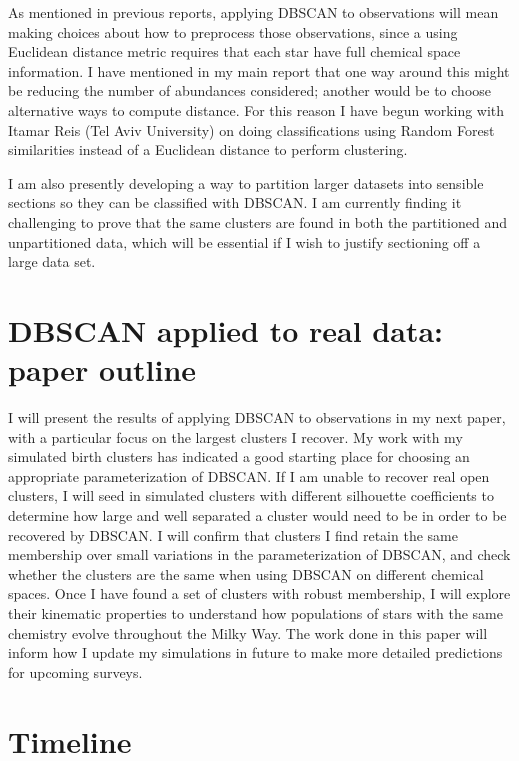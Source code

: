 \documentclass[11pt]{article}
\begin{document}
    As mentioned in previous reports, applying DBSCAN to observations will mean making choices about how to preprocess those observations, since a using Euclidean distance metric requires that each star have full chemical space information. I have mentioned in my main report that one way around this might be reducing the number of abundances considered; another would be to choose alternative ways to compute distance. For this reason I have begun working with Itamar Reis (Tel Aviv University) on doing classifications using Random Forest similarities \citep{Reis2018} instead of a Euclidean distance to perform clustering.
    
    I am also presently developing a way to partition larger datasets into sensible sections so they can be classified with DBSCAN. I am currently finding it challenging to prove that the same clusters are found in both the partitioned and unpartitioned data, which will be essential if I wish to justify sectioning off a large data set.
 
\section*{DBSCAN applied to real data: paper outline}

I will present the results of applying DBSCAN to observations in my next paper, with a particular focus on the largest clusters I recover. My work with my simulated birth clusters has indicated a good starting place for choosing an appropriate parameterization of DBSCAN. If I am unable to recover real open clusters, I will seed in simulated clusters with different silhouette coefficients to determine how large and well separated a cluster would need to be in order to be recovered by DBSCAN. I will confirm that clusters I find retain the same membership over small variations in the parameterization of DBSCAN, and check whether the clusters are the same when using DBSCAN on different chemical spaces. Once I have found a set of clusters with robust membership, I will explore their kinematic properties to understand how populations of stars with the same chemistry evolve throughout the Milky Way. The work done in this paper will inform how I update my simulations in future to make more detailed predictions for upcoming surveys.


\section*{Timeline}
\end{document}
